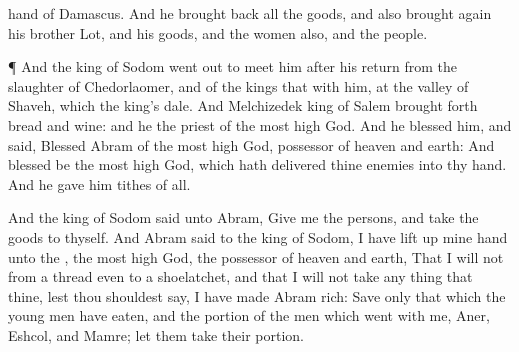 {hand of
Damascus.
And he brought
back all the
goods, and also brought
again his
brother
Lot, and his
goods, and the
women also, and the
people.
\par }{\PP {}¶ And the
king of
Sodom went
out to
meet him
after his
return from the
slaughter of
Chedorlaomer, and of the
kings that
{} with him, at the
valley of
Shaveh,
which
{} the
king’s
dale.
And
Melchizedek
king of
Salem brought
forth
bread and
wine: and he
{} the
priest of the most
high
God.
And he
blessed him, and
said,
Blessed
{}
Abram of the most
high
God,
possessor of
heaven and
earth:
And
blessed be the most
high
God, which hath
delivered thine
enemies into thy
hand. And he
gave him
tithes of all.
\par }{\PP {}And the
king of
Sodom
said unto
Abram,
Give me the
persons, and
take the
goods to thyself.
And
Abram
said to the
king of
Sodom, I have lift
up mine
hand unto the
{}, the most
high
God, the
possessor of
heaven and
earth,
That I will
not
{} from a
thread even to a
shoelatchet, and that I will
not
take any thing that
{} thine, lest thou shouldest
say, I have
made
Abram
rich:
Save only that
which the young
men have
eaten, and the
portion of the
men which
went
with me,
Aner,
Eshcol, and
Mamre; let
them
take their
portion.

}
